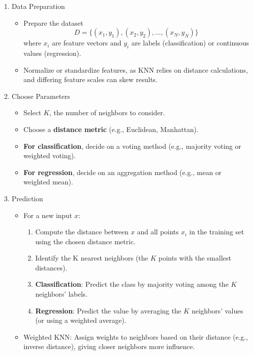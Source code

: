 \begin{enumerate}[label=Step \arabic*:, align=left, leftmargin=20pt,labelsep=1em]
    \item Data Preparation
    \begin{itemize}
        \item Prepare the dataset
            \[D = \{(x_1, y_1), (x_2, y_2), \dots, (x_N, y_N)\}\]
            where $x_i$ are feature vectors and $y_i$ are labels (classification) or continuous values (regression).
        \item Normalize or standardize features, as KNN relies on distance calculations, and differing feature scales can skew results.
    \end{itemize}

    \item Choose Parameters
    \begin{itemize}
        \item Select $K$, the number of neighbors to consider.
        \item Choose a \textbf{distance metric} (e.g., Euclidean, Manhattan).
        \item \textbf{For classification}, decide on a voting method (e.g., majority voting or weighted voting).
        \item \textbf{For regression}, decide on an aggregation method (e.g., mean or weighted mean).
    \end{itemize}

    \item Prediction
    \begin{itemize}
        \item For a new input $x$:
        \begin{enumerate}
            \item Compute the distance between $x$ and all points $x_i$ in the training set using the chosen distance metric.
            \item Identify the K nearest neighbors (the $K$ points with the smallest distances).
            \item \textbf{Classification}: Predict the class by majority voting among the $K$ neighbors' labels.
            \item \textbf{Regression}: Predict the value by averaging the $K$ neighbors' values (or using a weighted average).
        \end{enumerate}
        \item Weighted KNN: Assign weights to neighbors based on their distance (e.g., inverse distance), giving closer neighbors more influence.
    \end{itemize}
\end{enumerate}

